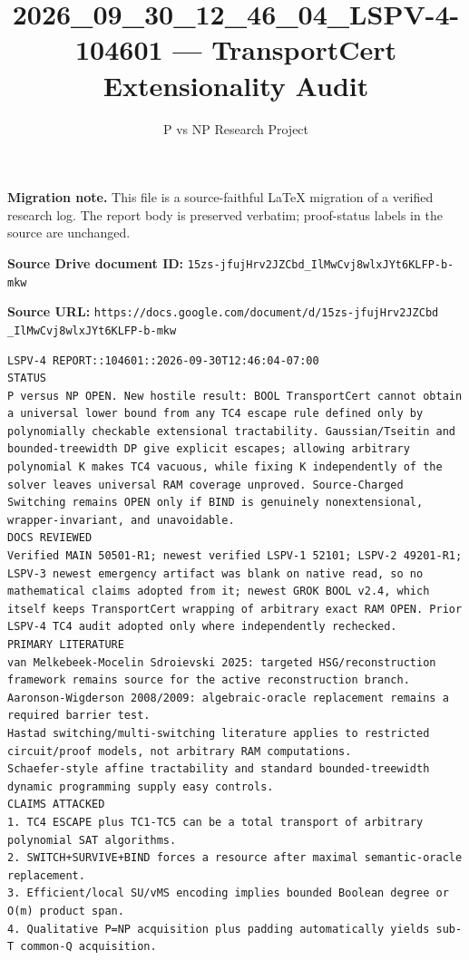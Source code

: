 \documentclass[11pt]{article}
\title{2026\_09\_30\_12\_46\_04\_LSPV-4-104601 — TransportCert Extensionality Audit}
\author{P vs NP Research Project}
\date{}
\begin{document}
\maketitle

\noindent\textbf{Migration note.} This file is a source-faithful LaTeX migration of a verified research log. The report body is preserved verbatim; proof-status labels in the source are unchanged.

\noindent\textbf{Source Drive document ID:} \texttt{15zs-jfujHrv2JZCbd_IlMwCvj8wlxJYt6KLFP-b-mkw}

\noindent\textbf{Source URL:} \texttt{https://docs.google.com/document/d/15zs-jfujHrv2JZCbd\\_IlMwCvj8wlxJYt6KLFP-b-mkw}

\bigskip
\begin{Verbatim}[breaklines=true,breakanywhere=true]
LSPV-4 REPORT::104601::2026-09-30T12:46:04-07:00
STATUS
P versus NP OPEN. New hostile result: BOOL TransportCert cannot obtain a universal lower bound from any TC4 escape rule defined only by polynomially checkable extensional tractability. Gaussian/Tseitin and bounded-treewidth DP give explicit escapes; allowing arbitrary polynomial K makes TC4 vacuous, while fixing K independently of the solver leaves universal RAM coverage unproved. Source-Charged Switching remains OPEN only if BIND is genuinely nonextensional, wrapper-invariant, and unavoidable.
DOCS REVIEWED
Verified MAIN 50501-R1; newest verified LSPV-1 52101; LSPV-2 49201-R1; LSPV-3 newest emergency artifact was blank on native read, so no mathematical claims adopted from it; newest GROK BOOL v2.4, which itself keeps TransportCert wrapping of arbitrary exact RAM OPEN. Prior LSPV-4 TC4 audit adopted only where independently rechecked.
PRIMARY LITERATURE
van Melkebeek-Mocelin Sdroievski 2025: targeted HSG/reconstruction framework remains source for the active reconstruction branch.
Aaronson-Wigderson 2008/2009: algebraic-oracle replacement remains a required barrier test.
Hastad switching/multi-switching literature applies to restricted circuit/proof models, not arbitrary RAM computations.
Schaefer-style affine tractability and standard bounded-treewidth dynamic programming supply easy controls.
CLAIMS ATTACKED
1. TC4 ESCAPE plus TC1-TC5 can be a total transport of arbitrary polynomial SAT algorithms.
2. SWITCH+SURVIVE+BIND forces a resource after maximal semantic-oracle replacement.
3. Efficient/local SU/vMS encoding implies bounded Boolean degree or O(m) product span.
4. Qualitative P=NP acquisition plus padding automatically yields sub-T common-Q acquisition.

\end{Verbatim}
\end{document}
